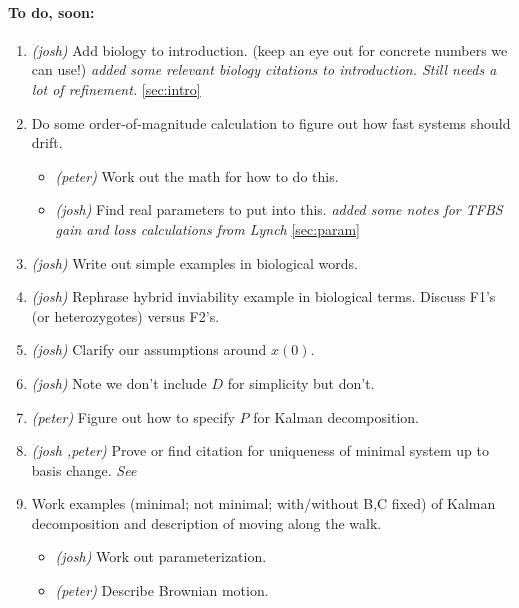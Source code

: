 \documentclass[11 pt]{article}
\newcommand{\jss}[1]{{\color{olive}\it #1}}
\begin{document}
\paragraph{To do, soon:}

\begin{enumerate}

  \item \emph{(josh)} Add biology to introduction. (keep an eye out for concrete numbers we can use!) \jss{added some relevant biology citations to introduction. Still needs a lot of refinement.} \ref{sec:intro}

    \item Do some order-of-magnitude calculation to figure out how fast systems should drift.
        \begin{itemize}
            \item \emph{(peter)} Work out the math for how to do this.
            \item \emph{(josh)} Find real parameters to put into this. 
              \jss{added some notes for TFBS gain and loss calculations from Lynch} \ref{sec:param}
        \end{itemize}

    \item \emph{(josh)} Write out simple examples in biological words.

    \item \emph{(josh)} Rephrase hybrid inviability example in biological terms.  Discuss F1's (or heterozygotes) versus F2's.

    \item \emph{(josh)} Clarify our assumptions around $x(0)$. 

    \item \emph{(josh)} Note we don't include $D$ for simplicity but don't.

    \item \emph{(peter)} Figure out how to specify $P$ for Kalman decomposition.

    \item \emph{(josh \jss{\checkmark},peter)} Prove or find citation for uniqueness of minimal system up to basis change. \jss{See \citep[Chapter 10.6, Theorem 6.9: Fundamental Theorem of Linear Realization Theory.]{kalman1969topics}}

    \item Work examples (minimal; not minimal; with/without B,C fixed) of Kalman decomposition and description of moving along the walk.
        \begin{itemize}
            \item \emph{(josh)} Work out parameterization.
            \item \emph{(peter)} Describe Brownian motion.
        \end{itemize}


\end{enumerate}
\end{document}
